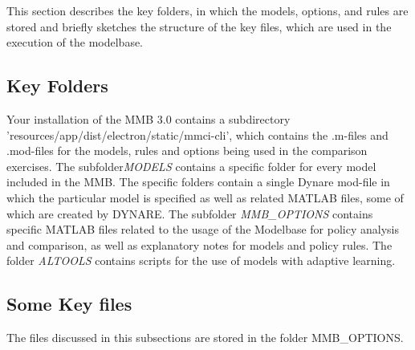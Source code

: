 This section describes the key folders, in which the models, options, and rules are stored and briefly sketches the structure of the key files, which are used in the execution of the modelbase.

\subsection*{Key Folders}
 
Your installation of the MMB 3.0 contains a subdirectory 'resources/app/dist/electron/static/mmci-cli', which contains the .m-files and .mod-files for the models, rules and options being used in the comparison exercises. 
The subfolder\textit{MODELS} contains a specific folder for every model included in the MMB. The specific folders contain a single Dynare mod-file in which the particular model is specified as well as related MATLAB files, some of which are created by DYNARE. The subfolder \textit{MMB\_OPTIONS} contains specific MATLAB files related to the usage of the Modelbase for policy analysis and comparison, as well as explanatory notes for models and policy rules. The folder 
\textit{ALTOOLS} contains scripts for the use of models with adaptive learning. 

\subsection*{Some Key files}
The files discussed in this subsections are stored in the folder MMB\_OPTIONS.

